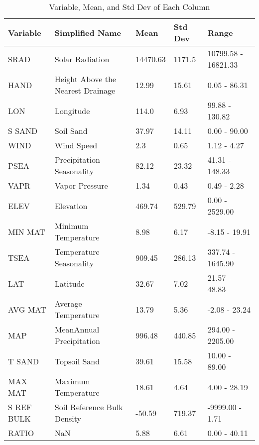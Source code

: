 \begin{table}
\caption{Variable, Mean, and Std Dev of Each Column}
\label{tab:range}
\begin{tabular}{lllll}
\toprule
Variable & Simplified Name & Mean & Std Dev & Range \\
\midrule
SRAD & Solar Radiation & 14470.63 & 1171.5 & 10799.58 - 16821.33 \\
HAND & Height Above the Nearest Drainage & 12.99 & 15.61 & 0.05 - 86.31 \\
LON & Longitude & 114.0 & 6.93 & 99.88 - 130.82 \\
S SAND & Soil Sand & 37.97 & 14.11 & 0.00 - 90.00 \\
WIND & Wind Speed & 2.3 & 0.65 & 1.12 - 4.27 \\
PSEA & Precipitation Seasonality & 82.12 & 23.32 & 41.31 - 148.33 \\
VAPR & Vapor Pressure & 1.34 & 0.43 & 0.49 - 2.28 \\
ELEV & Elevation & 469.74 & 529.79 & 0.00 - 2529.00 \\
MIN MAT & Minimum Temperature & 8.98 & 6.17 & -8.15 - 19.91 \\
TSEA & Temperature Seasonality & 909.45 & 286.13 & 337.74 - 1645.90 \\
LAT & Latitude & 32.67 & 7.02 & 21.57 - 48.83 \\
AVG MAT & Average Temperature & 13.79 & 5.36 & -2.08 - 23.24 \\
MAP & MeanAnnual Precipitation & 996.48 & 440.85 & 294.00 - 2205.00 \\
T SAND & Topsoil Sand & 39.61 & 15.58 & 10.00 - 89.00 \\
MAX MAT & Maximum Temperature & 18.61 & 4.64 & 4.00 - 28.19 \\
S REF BULK & Soil Reference Bulk Density & -50.59 & 719.37 & -9999.00 - 1.71 \\
RATIO & NaN & 5.88 & 6.61 & 0.00 - 40.11 \\
\bottomrule
\end{tabular}
\end{table}
